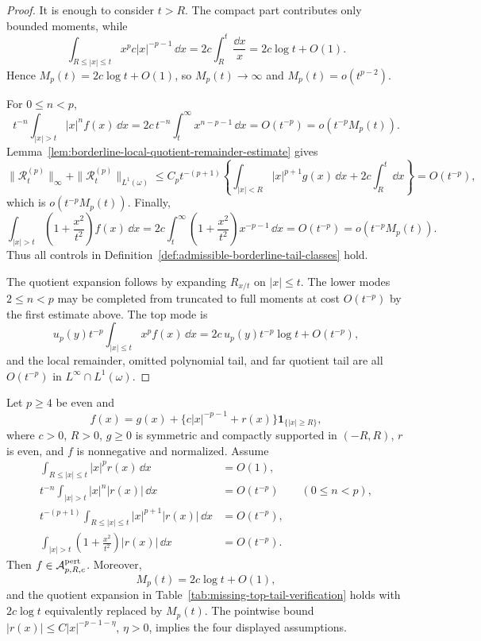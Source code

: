\begin{proof}
It is enough to consider \(t>R\).  The compact part contributes only bounded
moments, while
\[
\int_{R\le |x|\le t}x^p c|x|^{-p-1}\,\dd x
=2c\int_R^t\frac{\dd x}{x}
=2c\log t+O(1).
\]
Hence \(M_p(t)=2c\log t+O(1)\), so \(M_p(t)\to\infty\) and
\(M_p(t)=o(t^{p-2})\).

For \(0\le n<p\),
\[
t^{-n}\int_{|x|>t}|x|^nf(x)\,\dd x
=2c\,t^{-n}\int_t^\infty x^{n-p-1}\,\dd x
=O(t^{-p})
=o(t^{-p}M_p(t)).
\]
Lemma~\ref{lem:borderline-local-quotient-remainder-estimate} gives
\[
\|\mathcal R_t^{(p)}\|_\infty+\|\mathcal R_t^{(p)}\|_{L^1(\omega)}
\le
C_pt^{-(p+1)}
\left\{\int_{|x|<R}|x|^{p+1}g(x)\,\dd x
+2c\int_R^t\dd x\right\}
=O(t^{-p}),
\]
which is \(o(t^{-p}M_p(t))\).  Finally,
\[
\int_{|x|>t}\left(1+\frac{x^2}{t^2}\right)f(x)\,\dd x
=2c\int_t^\infty\left(1+\frac{x^2}{t^2}\right)x^{-p-1}\,\dd x
=O(t^{-p})
=o(t^{-p}M_p(t)).
\]
Thus all controls in
Definition~\ref{def:admissible-borderline-tail-classes} hold.

The quotient expansion follows by expanding \(R_{x/t}\) on \(|x|\le t\).  The
lower modes \(2\le n<p\) may be completed from truncated to full moments at
cost \(O(t^{-p})\) by the first estimate above.  The top mode is
\[
u_p(y)t^{-p}\int_{|x|\le t}x^pf(x)\,\dd x
=2c\,u_p(y)t^{-p}\log t+O(t^{-p}),
\]
and the local remainder, omitted polynomial tail, and far quotient tail are
all \(O(t^{-p})\) in \(L^\infty\cap L^1(\omega)\).
\end{proof}

\begin{lemma}
\label{lem:perturbative-power-borderline-tail-controls}
Let \(p\ge4\) be even and
\[
f(x)=g(x)+\{c|x|^{-p-1}+r(x)\}\mathbf1_{\{|x|\ge R\}},
\]
where \(c>0\), \(R>0\), \(g\ge0\) is symmetric and compactly supported in
\((-R,R)\), \(r\) is even, and \(f\) is nonnegative and normalized.  Assume
\begin{align*}
\int_{R\le |x|\le t}|x|^pr(x)\,\dd x&=O(1),\\
t^{-n}\int_{|x|>t}|x|^n|r(x)|\,\dd x&=O(t^{-p})
      \qquad(0\le n<p),\\
t^{-(p+1)}\int_{R\le |x|\le t}|x|^{p+1}|r(x)|\,\dd x&=O(t^{-p}),\\
\int_{|x|>t}\left(1+\frac{x^2}{t^2}\right)|r(x)|\,\dd x&=O(t^{-p}).
\end{align*}
Then \(f\in\mathcal A_{p,R,c}^{\rm pert}\).  Moreover,
\[
M_p(t)=2c\log t+O(1),
\]
and the quotient expansion in Table~\ref{tab:missing-top-tail-verification}
holds with \(2c\log t\) equivalently replaced by \(M_p(t)\).
The pointwise bound \(|r(x)|\le C|x|^{-p-1-\eta}\), \(\eta>0\), implies the
four displayed assumptions.
\end{lemma}

